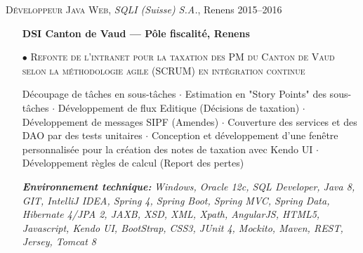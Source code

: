 \documentclass[11pt,a4paper]{moderncv}
\begin{document}
\begin{tcolorbox}[boxrule=0pt,arc=0pt,colback=lightgray]{\textsc{Développeur Java Web}, \emph{SQLI (Suisse) S.A.}, Renens \hfill 2015--2016}
\end{tcolorbox}
\begin{itemize}

	\item[] \textbf{DSI Canton de Vaud --- Pôle fiscalité, Renens}
	
	\item[$\bullet$] \textsc{Refonte de l’intranet pour la taxation des PM du Canton de Vaud selon la méthodologie agile (SCRUM) en intégration continue}
	\item[] Découpage de tâches en sous-tâches $\cdot$ Estimation en "Story Points" des sous-tâches $\cdot$ Développement de flux Editique (Décisions de taxation) $\cdot$ Développement de messages SIPF (Amendes) $\cdot$ Couverture des services et des DAO par des tests unitaires $\cdot$ Conception et développement d'une fenêtre personnalisée pour la création des notes de taxation avec Kendo UI $\cdot$ Développement règles de calcul (Report des pertes)
	\item[] \emph{\textbf{Environnement technique:}} \emph{Windows, Oracle 12c, SQL Developer, Java 8, GIT, IntelliJ IDEA, Spring 4, Spring Boot, Spring MVC, Spring Data, Hibernate 4/JPA 2, JAXB, XSD, XML, Xpath, AngularJS, HTML5, Javascript, Kendo UI, BootStrap, CSS3, JUnit 4, Mockito, Maven, REST, Jersey, Tomcat 8}
\end{itemize}
\end{document}
